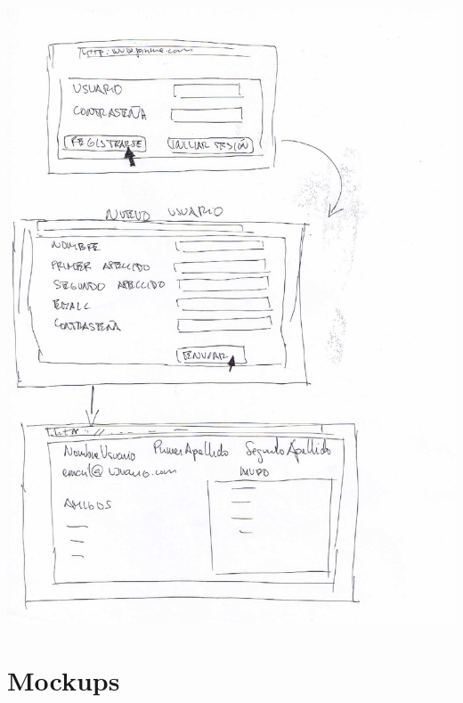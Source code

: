 \documentclass[12pt, a4paper, titlepage]{article}
\begin{document}
	\begin{center}
		\includegraphics[scale=0.5]{Imagenes/registrarse}
	\end{center}

\clearpage
\section{Mockups}
\end{document}
